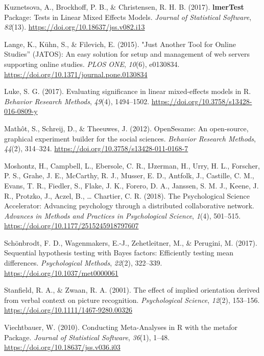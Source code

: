 \documentclass[
  man,floatsintext]{apa6}
\newlength{\cslhangindent}
\newlength{\cslentryspacingunit} %
\newenvironment{CSLReferences}[2] %
 {%
  \setlength{\parindent}{0pt}
  \ifodd #1
  \let\oldpar\par
  \def\par{\hangindent=\cslhangindent\oldpar}
  \fi
  \setlength{\parskip}{#2\cslentryspacingunit}
 }%
 {}
\begin{document}
\begin{CSLReferences}{1}{0}
\leavevmode{}%
Kuznetsova, A., Brockhoff, P. B., \& Christensen, R. H. B. (2017). {\textbf{lmerTest}} {Package}: {Tests} in {Linear Mixed Effects Models}. \emph{Journal of Statistical Software}, \emph{82}(13). \url{https://doi.org/10.18637/jss.v082.i13}

\leavevmode{}%
Lange, K., Kühn, S., \& Filevich, E. (2015). "{Just Another Tool} for {Online Studies}'' ({JATOS}): {An} easy solution for setup and management of web servers supporting online studies. \emph{PLOS ONE}, \emph{10}(6), e0130834. \url{https://doi.org/10.1371/journal.pone.0130834}

\leavevmode{}%
Luke, S. G. (2017). Evaluating significance in linear mixed-effects models in {R}. \emph{Behavior Research Methods}, \emph{49}(4), 1494--1502. \url{https://doi.org/10.3758/s13428-016-0809-y}

\leavevmode{}%
Mathôt, S., Schreij, D., \& Theeuwes, J. (2012). {OpenSesame}: {An} open-source, graphical experiment builder for the social sciences. \emph{Behavior Research Methods}, \emph{44}(2), 314--324. \url{https://doi.org/10.3758/s13428-011-0168-7}

\leavevmode{}%
Moshontz, H., Campbell, L., Ebersole, C. R., IJzerman, H., Urry, H. L., Forscher, P. S., Grahe, J. E., McCarthy, R. J., Musser, E. D., Antfolk, J., Castille, C. M., Evans, T. R., Fiedler, S., Flake, J. K., Forero, D. A., Janssen, S. M. J., Keene, J. R., Protzko, J., Aczel, B., \ldots{} Chartier, C. R. (2018). The {Psychological Science Accelerator}: {Advancing} psychology through a distributed collaborative network. \emph{Advances in Methods and Practices in Psychological Science}, \emph{1}(4), 501--515. \url{https://doi.org/10.1177/2515245918797607}

\leavevmode{}%
Schönbrodt, F. D., Wagenmakers, E.-J., Zehetleitner, M., \& Perugini, M. (2017). Sequential hypothesis testing with {Bayes} factors: {Efficiently} testing mean differences. \emph{Psychological Methods}, \emph{22}(2), 322--339. \url{https://doi.org/10.1037/met0000061}

\leavevmode{}%
Stanfield, R. A., \& Zwaan, R. A. (2001). The effect of implied orientation derived from verbal context on picture recognition. \emph{Psychological Science}, \emph{12}(2), 153--156. \url{https://doi.org/10.1111/1467-9280.00326}

\leavevmode{}%
Viechtbauer, W. (2010). Conducting {Meta}-{Analyses} in {R} with the metafor {Package}. \emph{Journal of Statistical Software}, \emph{36}(1), 1--48. \url{https://doi.org/10.18637/jss.v036.i03}

\end{CSLReferences}

\endgroup

\newpage

\hypertarget{appendix-appendix}{%
\appendix}
\end{document}
